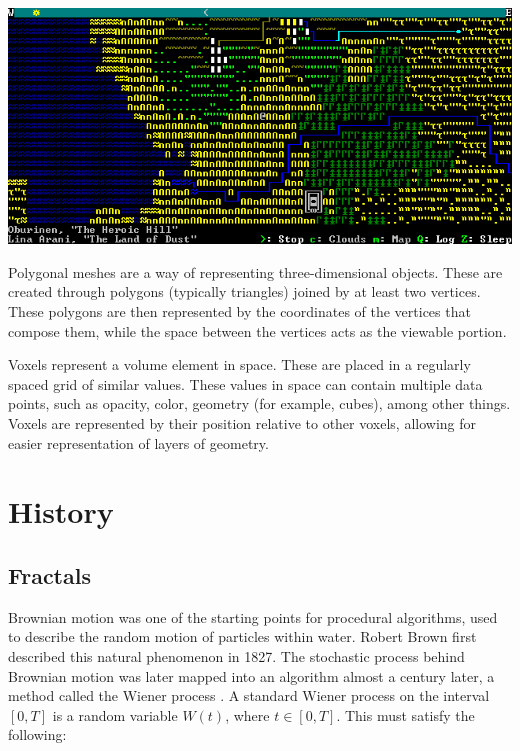 \documentclass[10pt]{report}
\begin{document}
		\begin{minipage}{\textwidth}
			\centering
			\includegraphics[scale=.5]{dwarf_fortress}
			\label{fig:asciidf}
		\end{minipage}
		
		Polygonal meshes are a way of representing three-dimensional objects. These are created through polygons (typically triangles) joined by at least two vertices. These polygons are then represented by the coordinates of the vertices that compose them, while the space between the vertices acts as the viewable portion.
		
		Voxels represent a volume element in space. These are placed in a regularly spaced grid of similar values. These values in space can contain multiple data points, such as opacity, color, geometry (for example, cubes), among other things. Voxels are represented by their position relative to other voxels, allowing for easier representation of layers of geometry. 
		
	\vspace{10pt}
	\let\clearpage\relax
	\chapter{History}
	
		\section{Fractals}
		Brownian motion was one of the starting points for procedural algorithms, used to describe the random motion of particles within water. Robert Brown first described this natural phenomenon in 1827. The stochastic process behind Brownian motion was later mapped into an algorithm almost a century later, a method called the Wiener process \cite{inbook}. A standard Wiener process on the interval \([0,T]\) is a random variable \(W(t)\), where \(t \in [0,T]\). This must satisfy the following:
		
\end{document}
